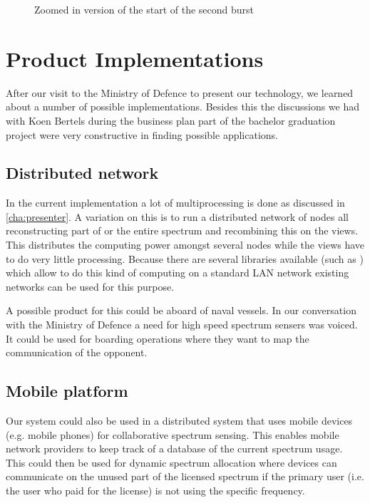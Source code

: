 \documentclass[a4paper, openany, oneside]{memoir}
\begin{document}
\begin{figure}[H]
\centering
{}
\caption{Zoomed in version of the start of the second burst}
\label{fig:plot_samplers_zoom}
\end{figure}


\section{Product Implementations}
\label{sec:product_implementations}
After our visit to the Ministry of Defence to present our technology, we learned about a number of possible implementations. Besides this the discussions we had with Koen Bertels during the business plan part of the bachelor graduation project were very constructive in finding possible applications.

\subsection{Distributed network}
\label{sec:distributed}
In the current implementation a lot of multiprocessing is done as discussed in \cref{cha:presenter}. A variation on this is to run a distributed network of nodes all reconstructing part of or the entire spectrum and recombining this on the views. This distributes the computing power amongst several nodes while the views  have to do very little processing. Because there are several libraries available (such as ) which allow to do this kind of computing on a standard LAN network existing networks can be used for this purpose.

A possible product for this could be aboard of naval vessels. In our conversation with the Ministry of Defence a need for high speed spectrum sensers was voiced. It could be used for boarding operations where they want to map the communication of the opponent.

\subsection{Mobile platform}
\label{sub:mobile_platform}
Our system could also be used in a distributed system that uses mobile devices (e.g. mobile phones) for collaborative spectrum sensing. This enables mobile network providers to keep track of a database of the current spectrum usage. This could then be used for dynamic spectrum allocation where devices can communicate on the unused part of the licensed spectrum if the primary user (i.e. the user who paid for the license) is not using the specific frequency.
\end{document}
